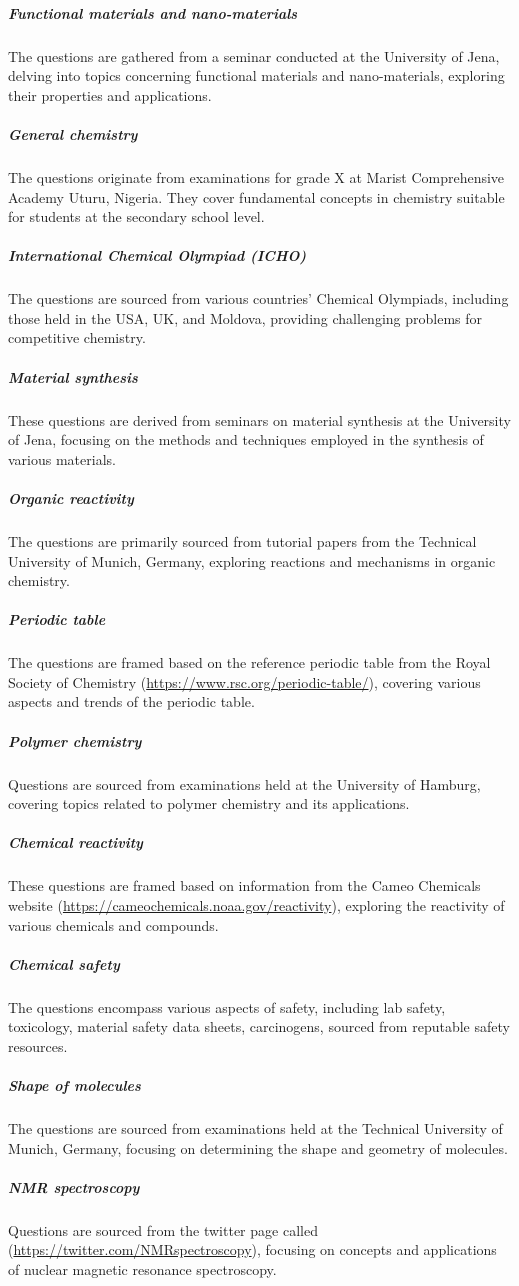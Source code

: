 \documentclass[11pt, oneside]{article}
\begin{document}
\subparagraph{Functional materials and nano-materials}
The questions are gathered from a seminar conducted at the University of Jena, delving into topics concerning functional materials and nano-materials, exploring their properties and applications.

\subparagraph{General chemistry}
The questions originate from examinations for grade X at Marist Comprehensive Academy Uturu, Nigeria. They cover fundamental concepts in chemistry suitable for students at the secondary school level.

\subparagraph{International Chemical Olympiad (\gls{ICHO})}
The questions are sourced from various countries' Chemical Olympiads, including those held in the USA, UK, and Moldova, providing challenging problems for competitive chemistry.

\subparagraph{Material synthesis}
These questions are derived from seminars on material synthesis at the University of Jena, focusing on the methods and techniques employed in the synthesis of various materials.

\subparagraph{Organic reactivity}
The questions are primarily sourced from tutorial papers from the Technical University of Munich, Germany, exploring reactions and mechanisms in organic chemistry.

\subparagraph{Periodic table}
The questions are framed based on the reference periodic table from the Royal Society of Chemistry (\url{https://www.rsc.org/periodic-table/}), covering various aspects and trends of the periodic table.

\subparagraph{Polymer chemistry}
Questions are sourced from examinations held at the University of Hamburg, covering topics related to polymer chemistry and its applications.

\subparagraph{Chemical reactivity}
These questions are framed based on information from the Cameo Chemicals website (\url{https://cameochemicals.noaa.gov/reactivity}), exploring the reactivity of various chemicals and compounds.

\subparagraph{Chemical safety}
The questions encompass various aspects of safety, including lab safety, toxicology, material safety data sheets, carcinogens, sourced from reputable safety resources.

\subparagraph{Shape of molecules}
The questions are sourced from examinations held at the Technical University of Munich, Germany, focusing on determining the shape and geometry of molecules.

\subparagraph{\gls{NMR} spectroscopy}
Questions are sourced from the twitter page called (\url{https://twitter.com/NMRspectroscopy}), focusing on concepts and applications of nuclear magnetic resonance spectroscopy.
\end{document}

